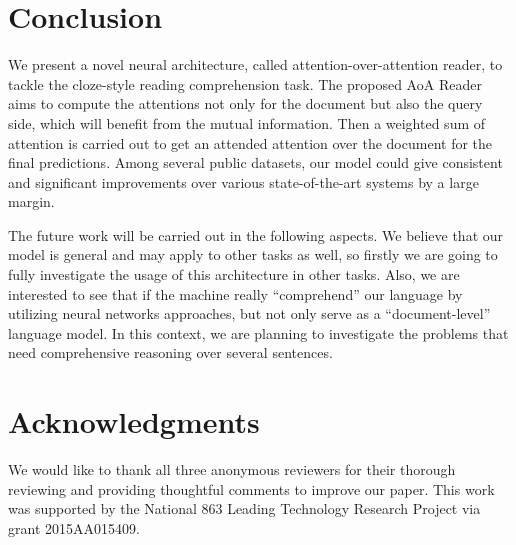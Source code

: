 \documentclass[11pt,a4paper]{article}
\begin{document}
\section{Conclusion}\label{conclusion}

We present a novel neural architecture, called attention-over-attention reader, to tackle the cloze-style reading comprehension task. 
The proposed AoA Reader aims to compute the attentions not only for the document but also the query side, which will benefit from the mutual information. 
Then a weighted sum of attention is carried out to get an attended attention over the document for the final predictions. 
Among several public datasets, our model could give consistent and significant improvements over various state-of-the-art systems by a large margin. 

The future work will be carried out in the following aspects. 
We believe that our model is general and may apply to other tasks as well, so firstly we are going to fully investigate the usage of this architecture in other tasks. 
Also, we are interested to see that if the machine really ``comprehend'' our language by utilizing neural networks approaches, but not only serve as a ``document-level'' language model. In this context, we are planning to investigate the problems that need comprehensive reasoning over several sentences.

\section*{Acknowledgments}
We would like to thank all three anonymous reviewers for their thorough reviewing and providing thoughtful comments to improve our paper. This work was supported by the National 863 Leading Technology Research Project via grant 2015AA015409. 



\end{document}
